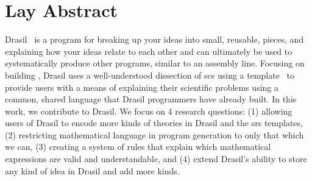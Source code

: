\chapter{Lay Abstract}
\label{chap:lay_abstract}

Drasil~\cite{Drasil2021} is a program for breaking up your ideas into small,
reusable, pieces, and explaining how your ideas relate to each other and can
ultimately be used to systematically produce other programs, similar to an
assembly line. Focusing on building , Drasil uses a well-understood
dissection of \acs{scs} using a  template~\cite{SmithAndLai2005} to
provide users with a means of explaining their scientific problems using a
common, shared language that Drasil programmers have already built. In this
work, we contribute to Drasil. We focus on 4 research questions: (1) allowing
users of Drasil to encode more kinds of theories in Drasil and the \acs{srs}
templates, (2) restricting mathematical language in program generation to only
that which we can, (3) creating a system of rules that explain which
mathematical expressions are valid and understandable, and (4) extend Drasil's
ability to store any kind of idea in Drasil and add more kinds.
